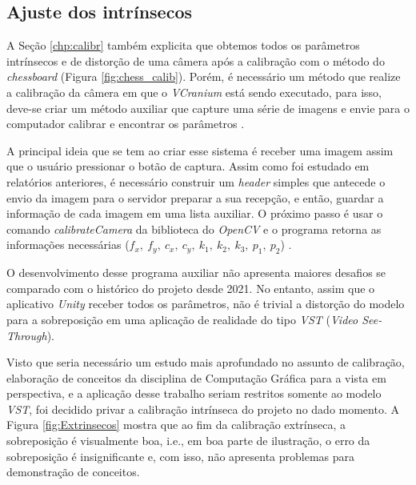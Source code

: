 \subsection{Ajuste dos intrínsecos}

A Seção \ref{chp:calibr} também explicita que obtemos todos os parâmetros intrínsecos e de distorção de uma câmera após a calibração com o método do \textit{chessboard} (Figura \ref{fig:chess_calib}). Porém, é necessário um método que realize a calibração da câmera em que o \textit{VCranium} está sendo executado, para isso, deve-se criar um método auxiliar que capture uma série de imagens e envie para o computador calibrar e encontrar os parâmetros \cite{Calibration}.

A principal ideia que se tem ao criar esse sistema é receber uma imagem assim que o usuário pressionar o botão de captura. Assim como foi estudado em relatórios anteriores, é necessário construir um \textit{header} simples que antecede o envio da imagem para o servidor preparar a sua recepção, e então, guardar a informação de cada imagem em uma lista auxiliar. O próximo passo é usar o comando \textit{calibrateCamera} da biblioteca do \textit{OpenCV} e o programa retorna as informações necessárias (\(f_x, \ f_y, \ c_x, \ c_y, \ k_1, \ k_2, \ k_3, \ p_1, \ p_2\)) \cite{Calibration}.

O desenvolvimento desse programa auxiliar não apresenta maiores desafios se comparado com o histórico do projeto desde 2021. No entanto, assim que o aplicativo \textit{Unity} receber todos os parâmetros, não é trivial a distorção do modelo para a sobreposição em uma aplicação de realidade do tipo \textit{VST} (\textit{Video See-Through}).

Visto que seria necessário um estudo mais aprofundado no assunto de calibração, elaboração de conceitos da disciplina de Computação Gráfica para a vista em perspectiva, e a aplicação desse trabalho seriam restritos somente ao modelo \textit{VST}, foi decidido privar a calibração intrínseca do projeto no dado momento. A Figura \ref{fig:Extrinsecos} mostra que ao fim da calibração extrínseca, a sobreposição é visualmente boa, i.e., em boa parte de ilustração, o erro da sobreposição é insignificante e, com isso, não apresenta problemas para demonstração de conceitos.